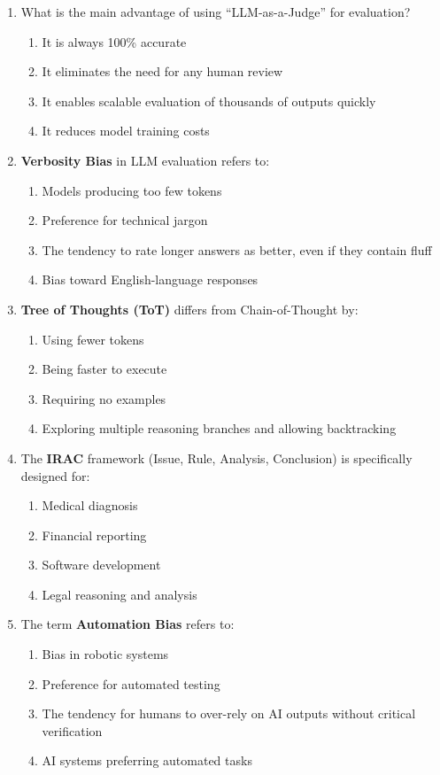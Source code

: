\documentclass[11pt]{article}
\begin{document}
\begin{enumerate}
\item What is the main advantage of using ``LLM-as-a-Judge'' for evaluation?
\begin{enumerate}[label=\Alph*)]
    \item It is always 100\% accurate
    \item It eliminates the need for any human review
    \item It enables scalable evaluation of thousands of outputs quickly
    \item It reduces model training costs
\end{enumerate}

\item \textbf{Verbosity Bias} in LLM evaluation refers to:
\begin{enumerate}[label=\Alph*)]
    \item Models producing too few tokens
    \item Preference for technical jargon
    \item The tendency to rate longer answers as better, even if they contain fluff
    \item Bias toward English-language responses
\end{enumerate}

\item \textbf{Tree of Thoughts (ToT)} differs from Chain-of-Thought by:
\begin{enumerate}[label=\Alph*)]
    \item Using fewer tokens
    \item Being faster to execute
    \item Requiring no examples
    \item Exploring multiple reasoning branches and allowing backtracking
\end{enumerate}

\item The \textbf{IRAC} framework (Issue, Rule, Analysis, Conclusion) is specifically designed for:
\begin{enumerate}[label=\Alph*)]
    \item Medical diagnosis
    \item Financial reporting
    \item Software development
    \item Legal reasoning and analysis
\end{enumerate}

\item The term \textbf{Automation Bias} refers to:
\begin{enumerate}[label=\Alph*)]
    \item Bias in robotic systems
    \item Preference for automated testing
    \item The tendency for humans to over-rely on AI outputs without critical verification
    \item AI systems preferring automated tasks
\end{enumerate}


\end{enumerate}
\end{document}
